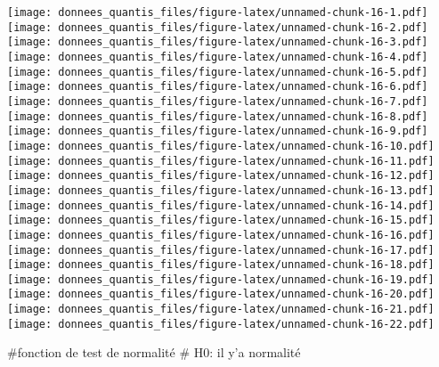 \documentclass[
]{article}
\begin{document}
\texttt{[image: donnees\_quantis\_files/figure-latex/unnamed-chunk-16-1.pdf]}
\texttt{[image: donnees\_quantis\_files/figure-latex/unnamed-chunk-16-2.pdf]}
\texttt{[image: donnees\_quantis\_files/figure-latex/unnamed-chunk-16-3.pdf]}
\texttt{[image: donnees\_quantis\_files/figure-latex/unnamed-chunk-16-4.pdf]}
\texttt{[image: donnees\_quantis\_files/figure-latex/unnamed-chunk-16-5.pdf]}
\texttt{[image: donnees\_quantis\_files/figure-latex/unnamed-chunk-16-6.pdf]}
\texttt{[image: donnees\_quantis\_files/figure-latex/unnamed-chunk-16-7.pdf]}
\texttt{[image: donnees\_quantis\_files/figure-latex/unnamed-chunk-16-8.pdf]}
\texttt{[image: donnees\_quantis\_files/figure-latex/unnamed-chunk-16-9.pdf]}
\texttt{[image: donnees\_quantis\_files/figure-latex/unnamed-chunk-16-10.pdf]}
\texttt{[image: donnees\_quantis\_files/figure-latex/unnamed-chunk-16-11.pdf]}
\texttt{[image: donnees\_quantis\_files/figure-latex/unnamed-chunk-16-12.pdf]}
\texttt{[image: donnees\_quantis\_files/figure-latex/unnamed-chunk-16-13.pdf]}
\texttt{[image: donnees\_quantis\_files/figure-latex/unnamed-chunk-16-14.pdf]}
\texttt{[image: donnees\_quantis\_files/figure-latex/unnamed-chunk-16-15.pdf]}
\texttt{[image: donnees\_quantis\_files/figure-latex/unnamed-chunk-16-16.pdf]}
\texttt{[image: donnees\_quantis\_files/figure-latex/unnamed-chunk-16-17.pdf]}
\texttt{[image: donnees\_quantis\_files/figure-latex/unnamed-chunk-16-18.pdf]}
\texttt{[image: donnees\_quantis\_files/figure-latex/unnamed-chunk-16-19.pdf]}
\texttt{[image: donnees\_quantis\_files/figure-latex/unnamed-chunk-16-20.pdf]}
\texttt{[image: donnees\_quantis\_files/figure-latex/unnamed-chunk-16-21.pdf]}
\texttt{[image: donnees\_quantis\_files/figure-latex/unnamed-chunk-16-22.pdf]}

\#fonction de test de normalité \# H0: il y'a normalité
\end{document}
